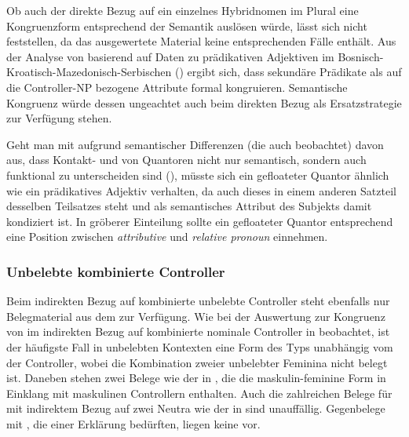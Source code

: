 Ob auch der direkte Bezug auf ein einzelnes Hybridnomen im
Plural eine Kongruenzform entsprechend der Semantik auslösen würde, lässt sich
nicht feststellen, da das ausgewertete Material keine entsprechenden Fälle
enthält. Aus der Analyse von \citet[54--55, 84]{wechslerzlatic2003} basierend
auf Daten zu prädikativen Adjektiven im
Bos\-nisch-\allowbreak{}Kroa\-tisch-\allowbreak{}Maze\-donisch-\allowbreak{}Ser\-bischen
() ergibt sich, dass sekundäre Prädikate als auf die
Controller-NP bezogene Attribute formal
kongruieren. Semantische
Kongruenz würde dessen ungeachtet auch beim direkten
Bezug als Ersatzstrategie zur Verfügung stehen.

Geht man mit \citet{spector2009} aufgrund semantischer Differenzen (die auch
\cite{pittner1995} beobachtet) davon aus, dass Kontakt- und
 von Quantoren nicht nur semantisch, sondern auch
funktional zu unterscheiden sind (), müsste sich ein
gefloateter Quantor ähnlich wie ein prädikatives Adjektiv verhalten, da
auch dieses in einem anderen Satzteil desselben Teilsatzes steht und als
semantisches Attribut des Subjekts damit kondiziert ist. In
 gröberer Einteilung sollte ein
gefloateter Quantor entsprechend eine Position zwischen \emph{attributive} und
\emph{relative pronoun} einnehmen.


\subsubsection{Unbelebte kombinierte Controller}

Beim indirekten Bezug auf kombinierte unbelebte Controller steht ebenfalls nur
Belegmaterial aus dem \CAO{} zur Verfügung. Wie bei der Auswertung zur
Kongruenz von  im indirekten Bezug auf kombinierte nominale
Controller in  beobachtet, ist der
häufigste Fall in unbelebten Kontexten eine Form des Typs 
unabhängig vom  der Controller, wobei die Kombination zweier
unbelebter Feminina nicht belegt ist. Daneben stehen zwei Belege wie der in
, die die maskulin-feminine Form  in Einklang
mit maskulinen Controllern enthalten. Auch die zahlreichen Belege für
 mit indirektem Bezug auf zwei Neutra wie der in 
sind unauffällig. Gegenbelege mit , die einer Erklärung bedürften,
liegen keine vor.

